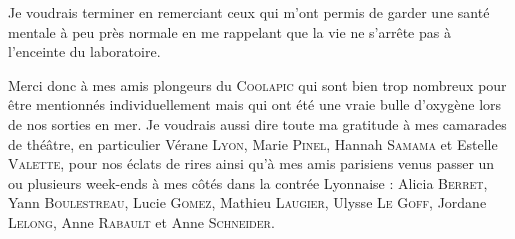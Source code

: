 Je voudrais terminer en remerciant ceux qui m'ont permis de garder une santé mentale à peu près normale en me rappelant que la vie ne s'arrête pas à l'enceinte du laboratoire.

Merci donc à mes amis plongeurs du \textsc{Coolapic} qui sont bien trop nombreux pour être mentionnés individuellement mais qui ont été une vraie bulle d'oxygène lors de nos sorties en mer.
Je voudrais aussi dire toute ma gratitude à mes camarades de thé\^atre, en particulier Vérane \textsc{Lyon}, Marie \textsc{Pinel}, Hannah \textsc{Samama} et Estelle \textsc{Valette}, pour nos éclats de rires ainsi qu'à mes amis parisiens venus passer un ou plusieurs week-ends à mes côtés dans la contrée Lyonnaise : Alicia \textsc{Berret}, Yann \textsc{Boulestreau}, Lucie \textsc{Gomez}, Mathieu \textsc{Laugier}, Ulysse \textsc{Le Goff}, Jordane \textsc{Lelong}, Anne \textsc{Rabault} et Anne \textsc{Schneider}.


